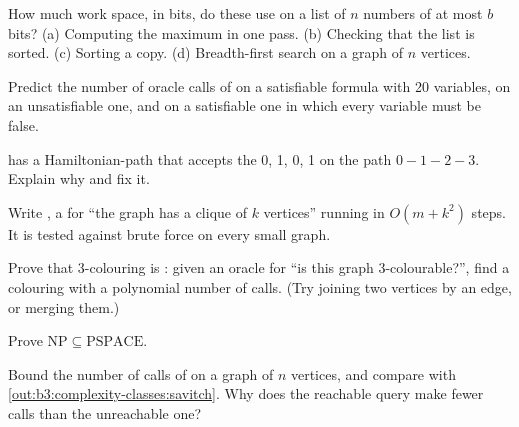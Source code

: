 \begin{exercise}[$\star$]\label{exo:b3:complexity-classes:3}
How much work space, in bits, do these use on a list of $n$ numbers of at most $b$ bits? (a) Computing the maximum in one pass. (b) Checking that the list is sorted. (c) Sorting a copy. (d) Breadth-first search on a graph of $n$ vertices.
\end{exercise}

\begin{exercise}[$\star$]\label{exo:b3:complexity-classes:4}
Predict the number of oracle calls of  on a satisfiable formula with 20 variables, on an unsatisfiable one, and on a satisfiable one in which every variable must be false.
\end{exercise}

\begin{exercise}[$\star\star$]\label{exo:b3:complexity-classes:5}
 has a Hamiltonian-path  that accepts the  0, 1, 0, 1 on the path $0 - 1 - 2 - 3$. Explain why and fix it.
\end{exercise}

\begin{exercise}[$\star\star$]\label{exo:b3:complexity-classes:6}
Write , a  for ``the graph has a clique of $k$ vertices'' running in $O(m + k^2)$ steps. It is tested against brute force on every small graph.
\end{exercise}

\begin{exercise}[$\star\star$]\label{exo:b3:complexity-classes:7}
Prove that 3-colouring is : given an oracle for ``is this graph 3-colourable?'', find a colouring with a polynomial number of calls. (Try joining two vertices by an edge, or merging them.)
\end{exercise}

\begin{exercise}[$\star\star$]\label{exo:b3:complexity-classes:8}
Prove $\mathrm{NP} \subseteq \mathrm{PSPACE}$.
\end{exercise}

\begin{exercise}[$\star\star$]\label{exo:b3:complexity-classes:9}
Bound the number of calls of  on a graph of $n$ vertices, and compare with \cref{out:b3:complexity-classes:savitch}. Why does the reachable query make fewer calls than the unreachable one?
\end{exercise}

